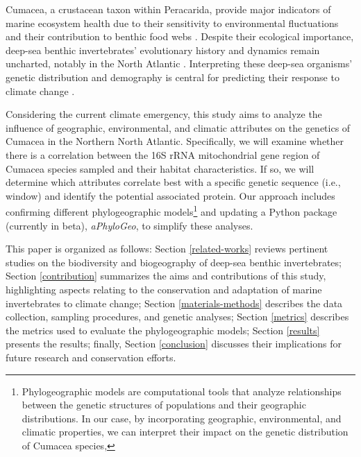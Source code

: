 Cumacea, a crustacean taxon within Peracarida, provide major indicators of marine ecosystem health due to their sensitivity to environmental fluctuations \citep{stransky_diversity_2010} and their contribution to benthic food webs \citep{rehm2009cumacea}. Despite their ecological importance, deep-sea benthic invertebrates’ evolutionary history and dynamics remain uncharted, notably in the North Atlantic \citep{jennings_phylogeographic_2014}. Interpreting these deep-sea organisms' genetic distribution and demography is central for predicting their response to climate change \citep{jennings_phylogeographic_2014}. 

Considering the current climate emergency, this study aims to analyze the influence of geographic, environmental, and climatic attributes on the genetics of Cumacea in the Northern North Atlantic. Specifically, we will examine whether there is a correlation between the 16S rRNA mitochondrial gene region of Cumacea species sampled and their habitat characteristics. If so, we will determine which attributes correlate best with a specific genetic sequence (i.e., window) and identify the potential associated protein. Our approach includes confirming different {phylogeographic models}\footnote{Phylogeographic models are computational tools that analyze relationships between the genetic structures of populations and their geographic distributions. In our case, by incorporating geographic, environmental, and climatic properties, we can interpret their impact on the genetic distribution of Cumacea species,} and updating a Python package (currently in beta), \textit{aPhyloGeo}, to simplify these analyses.

This paper is organized as follows: Section \autoref{related-works} reviews pertinent studies on the biodiversity and biogeography of deep-sea benthic invertebrates; Section \autoref{contribution} summarizes the aims and contributions of this study, highlighting aspects relating to the conservation and adaptation of marine invertebrates to climate change; Section \autoref{materials-methods} describes the data collection, sampling procedures, and genetic analyses; Section \autoref{metrics} describes the metrics used to evaluate the phylogeographic models; Section \autoref{results} presents the results; finally, Section \autoref{conclusion} discusses their implications for future research and conservation efforts.

